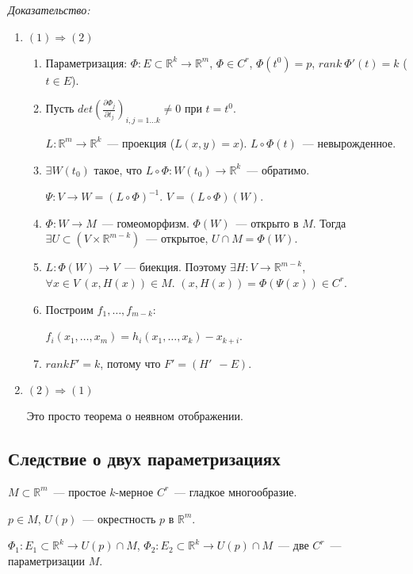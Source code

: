 \documentclass[paper=a4, fontsize=11pt]{article}
\begin{document}
\emph{Доказательство:}
\begin{enumerate}
    \item $(1) \Rightarrow (2)$
    \begin{enumerate}
        \item Параметризация: $\Phi: E \subset \mathds{R}^k \rightarrow \mathds{R}^m$, $\Phi \in C^r$, $\Phi(t^0) = p$,
        $rank\ \Phi'(t) = k$ ($t \in E$).
        \item Пусть $det(\frac{\partial \Phi_j}{\partial t_j})_{i,j=1\dots k} \neq 0$ при $t=t^0$.

        $L: \mathds{R}^m \rightarrow \mathds{R}^k$~--- проекция ($L(x,y) = x$). $L \circ \Phi(t)$~--- невырожденное.
        \item $\exists W(t_0)$ такое, что $L \circ \Phi: W(t_0) \rightarrow \mathds{R}^k$~--- обратимо.

        $\Psi: V \rightarrow W = (L \circ \Phi)^{-1}$. $V = (L\circ\Phi)(W)$.
        \item $\Phi: W \rightarrow M$~--- гомеоморфизм. $\Phi(W)$~--- открыто в $M$.
        Тогда $\exists U \subset (V \times \mathds{R}^{m-k})$~--- открытое, $U \cap M = \Phi(W)$.
        \item $L:\Phi(W) \rightarrow V$~--- биекция. Поэтому $\exists H:V \rightarrow \mathds{R}^{m-k}$,
        $\forall x \in V\ (x,H(x)) \in M$. $(x,H(x)) = \Phi(\Psi(x)) \in C^r$.
        \item Построим $f_1,\dots,f_{m-k}$:
        
        $f_i(x_1,\dots,x_m) = h_i(x_1,\dots,x_k) - x_{k+i}$.
        \item $rank F' = k$, потому что $F' = (H'\ \ -E)$.
    \end{enumerate}
    \item $(2) \Rightarrow (1)$
    
    Это просто теорема о неявном отображении.
\end{enumerate}

\subsection{Следствие о двух параметризациях}
$M \subset \mathds{R}^m$~--- простое $k$-мерное $C^r$~--- гладкое многообразие.

$p \in M$, $U(p)$~--- окрестность $p$ в $\mathds{R}^m$.

$\Phi_1: E_1 \subset \mathds{R}^k \rightarrow U(p) \cap M$, $\Phi_2: E_2 \subset \mathds{R}^k \rightarrow U(p) \cap M$~---
две $C^r$~--- параметризации $M$.
\end{document}
